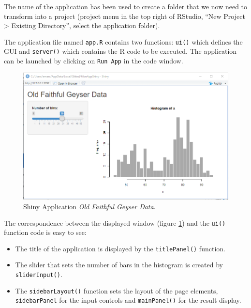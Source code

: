 \documentclass[
  12pt,
  american,
  a4paper,
  extrafontsizes,onecolumn,openright
  ]{memoir}
\providecommand{\tightlist}{%
  \setlength{\itemsep}{0pt}\setlength{\parskip}{0pt}}
\begin{document}
The name of the application has been used to create a folder that we now need to transform into a project (project menu in the top right of RStudio, \enquote{New Project \textgreater{} Existing Directory}, select the application folder).

The application file named \texttt{app.R} contains two functions: \texttt{ui()} which defines the GUI and \texttt{server()} which contains the R code to be executed.
The application can be launched by clicking on \texttt{Run\ App} in the code window.



\scriptsize

\begin{figure}

{\centering \includegraphics[width=0.8\linewidth]{images/shiny-geiser} 

}

\caption{Shiny Application \emph{Old Faithful Geyser Data}.}\label{fig:shiny-geiser}
\end{figure}

\normalsize

The correspondence between the displayed window (figure \ref{fig:shiny-geiser}) and the \texttt{ui()} function code is easy to see:

\begin{itemize}
\tightlist
\item
  The title of the application is displayed by the \texttt{titlePanel()} function.
\item
  The slider that sets the number of bars in the histogram is created by \texttt{sliderInput()}.
\item
  The \texttt{sidebarLayout()} function sets the layout of the page elements, \texttt{sidebarPanel} for the input controls and \texttt{mainPanel()} for the result display.
\end{itemize}
\end{document}

